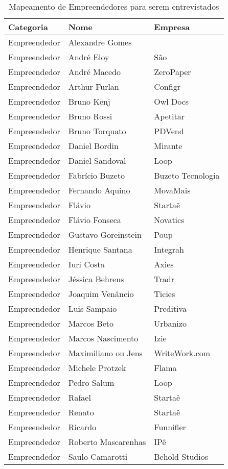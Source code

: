 \begin{table}[!htb]
	\centering
	\label{tabela:sugestao_de_empreendedores_para_entrevista}
	\begin{tabular}{ | p{3cm} | p{8cm} | p{4cm} | }
		\hline
		Categoria & Nome & Empresa \\ \hline
		Empreendedor & Alexandre Gomes & \\ \hline
		Empreendedor & André Eloy & São \\ \hline
		Empreendedor & André Macedo & ZeroPaper \\ \hline
		Empreendedor & Arthur Furlan & Configr \\ \hline
		Empreendedor & Bruno Kenj & Owl Docs \\ \hline
		Empreendedor & Bruno Rossi & Apetitar \\ \hline
		Empreendedor & Bruno Torquato & PDVend \\ \hline
		Empreendedor & Daniel Bordin & Mirante  \\ \hline
		Empreendedor & Daniel Sandoval & Loop \\ \hline
		Empreendedor & Fabrício Buzeto & Buzeto Tecnologia \\ \hline
		Empreendedor & Fernando Aquino & MovaMais \\ \hline
		Empreendedor & Flávio & Startaê \\ \hline	
		Empreendedor & Flávio Fonseca & Novatics \\ \hline
		Empreendedor & Gustavo Goreinstein & Poup \\ \hline	
		Empreendedor & Henrique Santana & Integrah \\ \hline
		Empreendedor & Iuri Costa & Axies \\ \hline
		Empreendedor & Jéssica Behrens & Tradr \\ \hline
		Empreendedor & Joaquim Venâncio & Ticies \\ \hline
		Empreendedor & Luis Sampaio & Preditiva  \\ \hline
		Empreendedor & Marcos Beto & Urbanizo \\ \hline
		Empreendedor & Marcos Nascimento & Izie \\ \hline
		Empreendedor & Maximiliano ou Jens & WriteWork.com \\ \hline
		Empreendedor & Michele Protzek & Flama \\ \hline
		Empreendedor & Pedro Salum & Loop \\ \hline
		Empreendedor & Rafael & Startaê \\ \hline	
		Empreendedor & Renato & Startaê \\ \hline	
		Empreendedor & Ricardo & Funnifier \\ \hline
		Empreendedor & Roberto Mascarenhas & IPê \\ \hline
		Empreendedor & Saulo Camarotti & Behold Studios \\ \hline	
	\end{tabular}
	\caption{Mapeamento de Empreendedores para serem entrevistados}
\end{table}

